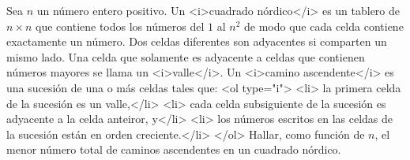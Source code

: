 Sea $n$ un número entero positivo. Un <i>cuadrado nórdico</i> es un tablero de $n\times n$ que contiene todos los números del $1$ al $n^2$ de modo que cada celda contiene exactamente un número. Dos celdas diferentes son adyacentes si comparten un mismo lado. Una celda que solamente es adyacente a celdas que contienen números mayores se llama un <i>valle</i>. Un <i>camino ascendente</i> es una sucesión de una o más celdas tales que:
<ol type="i">
<li> la primera celda de la sucesión es un valle,</li>
<li> cada celda subsiguiente de la sucesión es adyacente a la celda anteiror, y</li>
<li> los números escritos en las celdas de la sucesión están en orden creciente.</li>
</ol>
Hallar, como función de $n$, el menor número total de caminos ascendentes en un cuadrado nórdico.